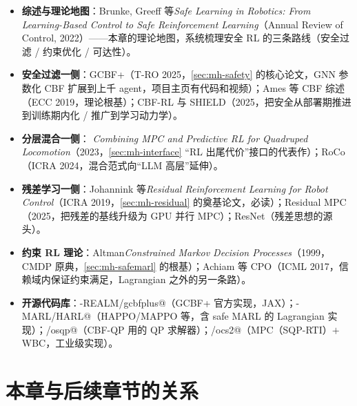 \begin{itemize}
  \item \textbf{综述与理论地图}：Brunke, Greeff 等\emph{Safe Learning in Robotics: From Learning-Based Control to Safe Reinforcement Learning}（Annual Review of Control, 2022\cite{brunke2022safe}）——本章的理论地图，系统梳理安全 RL 的三条路线（安全过滤 / 约束优化 / 可达性）。
  \item \textbf{安全过滤一侧}：GCBF+\cite{zhang2025gcbfplus}（T-RO 2025，\cref{sec:mh-safety} 的核心论文，GNN 参数化 CBF 扩展到上千 agent，项目主页有代码和视频）；Ames 等 CBF 综述\cite{ames2019cbf}（ECC 2019，理论根基）；CBF-RL\cite{gandhi2023shield} 与 SHIELD\cite{yin2023shield}（2025，把安全从部署期推进到训练期内化 / 推广到学习动力学）。
  \item \textbf{分层混合一侧}：
  \emph{Combining MPC and Predictive RL for Quadruped Locomotion}\cite{kovalev2023mpcrl}（2023，\cref{sec:mh-interface} “RL 出尾代价”接口的代表作）；RoCo\cite{mandi2024roco}（ICRA 2024，混合范式向“LLM 高层”延伸）。
  \item \textbf{残差学习一侧}：Johannink 等\emph{Residual Reinforcement Learning for Robot Control}\cite{johannink2019residual}（ICRA 2019，\cref{sec:mh-residual} 的奠基论文，必读）；Residual MPC\cite{residualmpc2025}（2025，把残差的基线升级为 GPU 并行 MPC）；ResNet\cite{he2016resnet}（残差思想的源头）。
  \item \textbf{约束 RL 理论}：Altman\emph{Constrained Markov Decision Processes}\cite{altman1999cmdp}（1999，CMDP 原典，\cref{sec:mh-safemarl} 的根基）；Achiam 等 CPO\cite{achiam2017constrained}（ICML 2017，信赖域内保证约束满足，Lagrangian 之外的另一条路）。
  \item \textbf{开源代码库}：\verb@MIT-REALM/gcbfplus@（GCBF+ 官方实现，JAX）；\verb@PKU-MARL/HARL@（HAPPO/MAPPO 等，含 safe MARL 的 Lagrangian 实现）；\verb@osqp/osqp@（CBF-QP 用的 QP 求解器）；\verb@leggedrobotics/ocs2@（MPC（SQP-RTI）$+$ WBC，工业级实现）。
\end{itemize}

\section*{本章与后续章节的关系}

